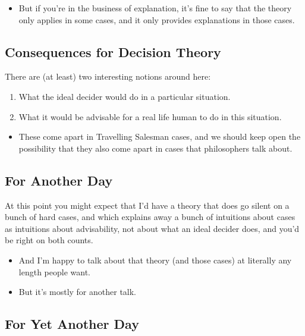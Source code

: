 \documentclass[
  11pt,
  letterpaper,
  DIV=11,
  numbers=noendperiod,
  oneside]{scrartcl}
\providecommand{\tightlist}{%
  \setlength{\itemsep}{0pt}\setlength{\parskip}{0pt}}\usepackage{longtable,booktabs,array}
\begin{document}
\begin{itemize}
\tightlist
\item
  But if you're in the business of explanation, it's fine to say that
  the theory only applies in some cases, and it only provides
  explanations in those cases.
\end{itemize}

\subsection{Consequences for Decision
Theory}\label{consequences-for-decision-theory-2}

There are (at least) two interesting notions around here:

\begin{enumerate}
\def\labelenumi{\arabic{enumi}.}
\tightlist
\item
  What the ideal decider would do in a particular situation.
\item
  What it would be advisable for a real life human to do in this
  situation.
\end{enumerate}

\begin{itemize}
\tightlist
\item
  These come apart in Travelling Salesman cases, and we should keep open
  the possibility that they also come apart in cases that philosophers
  talk about.
\end{itemize}

\subsection{For Another Day}\label{for-another-day}

At this point you might expect that I'd have a theory that does go
silent on a bunch of hard cases, and which explains away a bunch of
intuitions about cases as intuitions about advisability, not about what
an ideal decider does, and you'd be right on both counts.

\begin{itemize}
\tightlist
\item
  And I'm happy to talk about that theory (and those cases) at literally
  any length people want.
\item
  But it's mostly for another talk.
\end{itemize}

\subsection{For Yet Another Day}\label{for-yet-another-day}
\end{document}

